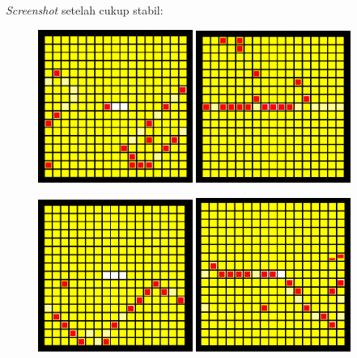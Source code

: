\documentclass[paper=a4, fontsize=11pt]{scrartcl}
\numberwithin{equation}{section} %
\numberwithin{figure}{section} %
\numberwithin{table}{section} %
\begin{document}
\textit{Screenshot} setelah cukup stabil:
\begin{figure}
	\centering
	\includegraphics[width=0.45\textwidth]{semut.png}
	\includegraphics[width=0.45\textwidth]{semut2.png}
\end{figure}
\begin{figure}
	\centering
	\includegraphics[width=0.45\textwidth]{semut3.png}
	\includegraphics[width=0.45\textwidth]{semut4.png}
\end{figure}
\end{document}
